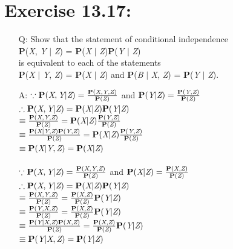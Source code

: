 \documentclass{article}
\begin{document}
\section{Exercise 13.17:}
\begin{itemize}
\item[Q:]Show that the statement of conditional independence\\\textbf P(\textit X, \textit Y $\vert$ \textit Z) = \textbf P(\textit X $\vert$ \textit Z)\textbf P(\textit Y $\vert$ \textit Z)\\is equivalent to each of the statements\\\textbf P(\textit X $\vert$ \textit Y, \textit Z) = \textbf P(\textit X $\vert$ \textit Z) and \textbf P(\textit B $\vert$ \textit X, \textit Z) = \textbf P(\textit Y $\vert$ \textit Z).
\item[A:]$\because\textbf P(\textit X, \textit Y \vert \textit Z) = \frac{\textbf P(\textit X, \textit Y, \textit Z)}{\textbf P(\textit Z)}$ and $\textbf P(\textit Y \vert \textit Z) = \frac{\textbf P(\textit Y, \textit Z)}{\textbf P(\textit Z)}$
\\$\therefore\textbf P(\textit X, \textit Y \vert \textit Z) = \textbf P(\textit X \vert \textit Z)\textbf P(\textit Y \vert \textit Z)$
\\$\equiv\frac{\textbf P(\textit X, \textit Y, \textit Z)}{\textbf P(\textit Z)} = \textbf P(\textit X \vert \textit Z)\frac{\textbf P(\textit Y, \textit Z)}{\textbf P(\textit Z)}$
\\$\equiv\frac{\textbf P(\textit X \vert \textit Y, \textit Z)\textbf P(\textit Y, \textit Z)}{\textbf P(\textit Z)}=\textbf P(\textit X \vert \textit Z)\frac{\textbf P(\textit Y, \textit Z)}{\textbf P(\textit Z)}$
\\$\equiv\textbf P(\textit X\vert\textit Y,\textit Z)=\textbf P(\textit X\vert\textit Z)$\\
%
\\$\because\textbf P(\textit X, \textit Y \vert \textit Z) = \frac{\textbf P(\textit X, \textit Y, \textit Z)}{\textbf P(\textit Z)}$ and $\textbf P(\textit X \vert \textit Z) = \frac{\textbf P(\textit X, \textit Z)}{\textbf P(\textit Z)}$
\\$\therefore\textbf P(\textit X, \textit Y \vert \textit Z) = \textbf P(\textit X \vert \textit Z)\textbf P(\textit Y \vert \textit Z)$
\\$\equiv\frac{\textbf P(\textit X, \textit Y, \textit Z)}{\textbf P(\textit Z)} = \frac{\textbf P(\textit X, \textit Z)}{\textbf P(\textit Z)}\textbf P(\textit Y \vert \textit Z)$
\\$\equiv\frac{\textbf P(\textit Y, \textit X, \textit Z)}{\textbf P(\textit Z)} = \frac{\textbf P(\textit X, \textit Z)}{\textbf P(\textit Z)}\textbf P(\textit Y \vert \textit Z)$
\\$\equiv\frac{\textbf P(\textit Y \vert \textit X, \textit Z)\textbf P(\textit X, \textit Z)}{\textbf P(\textit Z)}=\frac{\textbf P(\textit X, \textit Z)}{\textbf P(\textit Z)}\textbf P(\textit Y \vert \textit Z)$
\\$\equiv\textbf P(\textit Y\vert\textit X,\textit Z)=\textbf P(\textit Y\vert\textit Z)$
\end{itemize}
\end{document}
